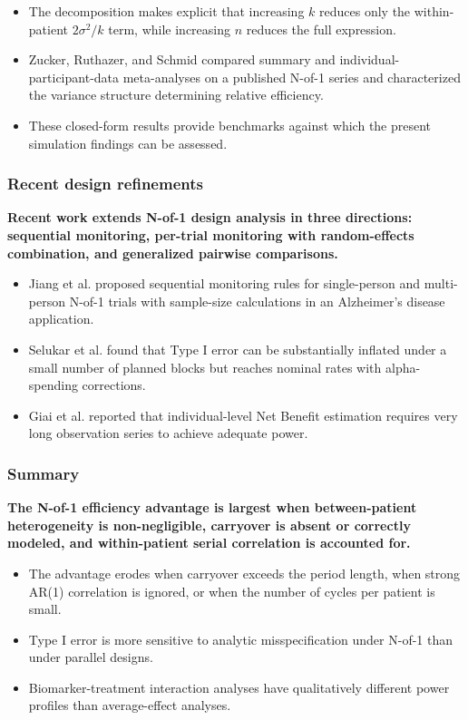 \documentclass[
  11pt,
]{article}
\begin{document}
\begin{itemize}\setlength{\itemsep}{2pt}\setlength{\parskip}{0pt}
\item The decomposition makes explicit that increasing $k$ reduces only the within-patient $2\sigma^2/k$ term, while increasing $n$ reduces the full expression.
\item Zucker, Ruthazer, and Schmid compared summary and individual-participant-data meta-analyses on a published N-of-1 series and characterized the variance structure determining relative efficiency.
\item These closed-form results provide benchmarks against which the present simulation findings can be assessed.
\end{itemize}

\subsubsection{Recent design refinements}\label{recent-design-refinements}

\textbf{Recent work extends N-of-1 design analysis in three directions: sequential monitoring, per-trial monitoring with random-effects combination, and generalized pairwise comparisons.}

\begin{itemize}\setlength{\itemsep}{2pt}\setlength{\parskip}{0pt}
\item Jiang et al. proposed sequential monitoring rules for single-person and multi-person N-of-1 trials with sample-size calculations in an Alzheimer's disease application.
\item Selukar et al. found that Type I error can be substantially inflated under a small number of planned blocks but reaches nominal rates with alpha-spending corrections.
\item Giai et al. reported that individual-level Net Benefit estimation requires very long observation series to achieve adequate power.
\end{itemize}

\subsubsection{Summary}\label{summary}

\textbf{The N-of-1 efficiency advantage is largest when between-patient heterogeneity is non-negligible, carryover is absent or correctly modeled, and within-patient serial correlation is accounted for.}

\begin{itemize}\setlength{\itemsep}{2pt}\setlength{\parskip}{0pt}
\item The advantage erodes when carryover exceeds the period length, when strong AR(1) correlation is ignored, or when the number of cycles per patient is small.
\item Type I error is more sensitive to analytic misspecification under N-of-1 than under parallel designs.
\item Biomarker-treatment interaction analyses have qualitatively different power profiles than average-effect analyses.
\end{itemize}
\end{document}
